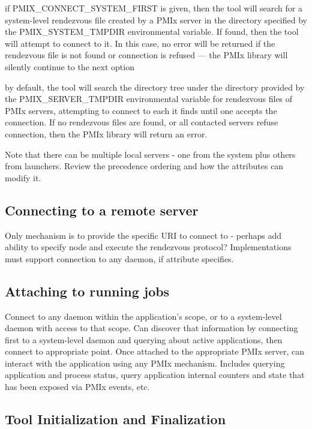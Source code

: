 if PMIX_CONNECT_SYSTEM_FIRST is given, then the tool will search for a system-level rendezvous file created by a PMIx server in the directory specified by the PMIX_SYSTEM_TMPDIR environmental variable. If found, then the tool will attempt to connect to it. In this case, no error will be returned if the rendezvous file is not found or connection is refused — the PMIx library will silently continue to the next option

by default, the tool will search the directory tree under the directory provided by the PMIX_SERVER_TMPDIR environmental variable for rendezvous files of PMIx servers, attempting to connect to each it finds until one accepts the connection. If no rendezvous files are found, or all contacted servers refuse connection, then the PMIx library will return an error.

Note that there can be multiple local servers - one from the system plus others from launchers. Review the precedence ordering and how the attributes can modify it.


\subsection{Connecting to a remote server}

Only mechanism is to provide the specific URI to connect to - perhaps add ability to specify node and execute the rendezvous protocol? Implementations must support connection to any daemon, if attribute specifies.


\subsection{Attaching to running jobs}

Connect to any daemon within the application's scope, or to a system-level daemon with access to that scope. Can discover that information by connecting first to a system-level daemon and querying about active applications, then connect to appropriate point. Once attached to the appropriate PMIx server, can interact with the application using any PMIx mechanism. Includes querying application and process status, query application internal counters and state that has been exposed via PMIx events, etc.

\subsection{Tool Initialization and Finalization}
\label{chap:tools:init}

